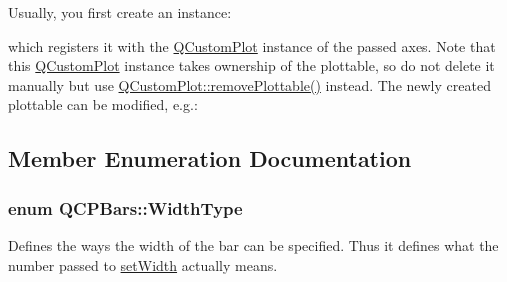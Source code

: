 Usually, you first create an instance\+: 
\begin{DoxyCodeInclude}
\end{DoxyCodeInclude}
which registers it with the \hyperlink{class_q_custom_plot}{Q\+Custom\+Plot} instance of the passed axes. Note that this \hyperlink{class_q_custom_plot}{Q\+Custom\+Plot} instance takes ownership of the plottable, so do not delete it manually but use \hyperlink{class_q_custom_plot_af3dafd56884208474f311d6226513ab2}{Q\+Custom\+Plot\+::remove\+Plottable()} instead. The newly created plottable can be modified, e.\+g.\+: 
\begin{DoxyCodeInclude}
\end{DoxyCodeInclude}


\subsection{Member Enumeration Documentation}
\subsubsection[{\texorpdfstring{Width\+Type}{WidthType}}]{\setlength{\rightskip}{0pt plus 5cm}enum {\bf Q\+C\+P\+Bars\+::\+Width\+Type}}\hypertarget{class_q_c_p_bars_a65dbbf1ab41cbe993d71521096ed4649}{}\label{class_q_c_p_bars_a65dbbf1ab41cbe993d71521096ed4649}
Defines the ways the width of the bar can be specified. Thus it defines what the number passed to \hyperlink{class_q_c_p_bars_afec6116579d44d5b706e0fa5e5332507}{set\+Width} actually means.

